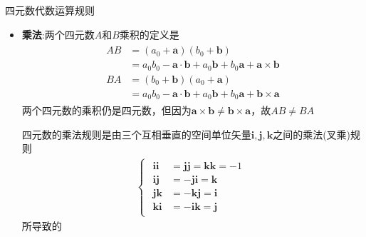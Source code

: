 \documentclass[UTF8,AutoFakeBold,AutoFakeSlant]{beamer}
\begin{document}
\begin{frame}{四元数代数运算规则}
    \begin{itemize}
        \small
        \item \textbf{乘法}:两个四元数$A$和$B$乘积的定义是
              \begin{align*}
                  \begin{split}
                      AB & =\left(a_0+\mathbf{a}\right)\left(b_0+\mathbf{b}\right)                                  \\
                         & =a_0b_0-\mathbf{a}\cdot\mathbf{b}+a_0\mathbf{b}+b_0\mathbf{a}+\mathbf{a}\times\mathbf{b} \\
                      BA & =\left(b_0+\mathbf{b}\right)\left(a_0+\mathbf{a}\right)                                  \\
                         & =a_0b_0-\mathbf{a}\cdot\mathbf{b}+a_0\mathbf{b}+b_0\mathbf{a}+\mathbf{b}\times\mathbf{a}
                  \end{split}
              \end{align*}
              两个四元数的乘积仍是四元数，但因为$\mathbf{a}\times\mathbf{b}\neq\mathbf{b}\times\mathbf{a}$，故$AB\neq BA$

              四元数的乘法规则是由三个互相垂直的空间单位矢量$\mathbf{i},\mathbf{j},\mathbf{k}$之间的乘法(叉乘)规则
              \begin{align*}
                  \left\{\begin{matrix}\begin{aligned}
                          \mathbf{ii} & =\mathbf{jj}=\mathbf{kk}=-1 \\
                          \mathbf{ij} & =-\mathbf{ji}=\mathbf{k}    \\
                          \mathbf{jk} & =-\mathbf{kj}=\mathbf{i}    \\
                          \mathbf{ki} & =-\mathbf{ik}=\mathbf{j}
                      \end{aligned}
                         \end{matrix}\right.
              \end{align*}
              所导致的
    \end{itemize}
\end{frame}
\end{document}
